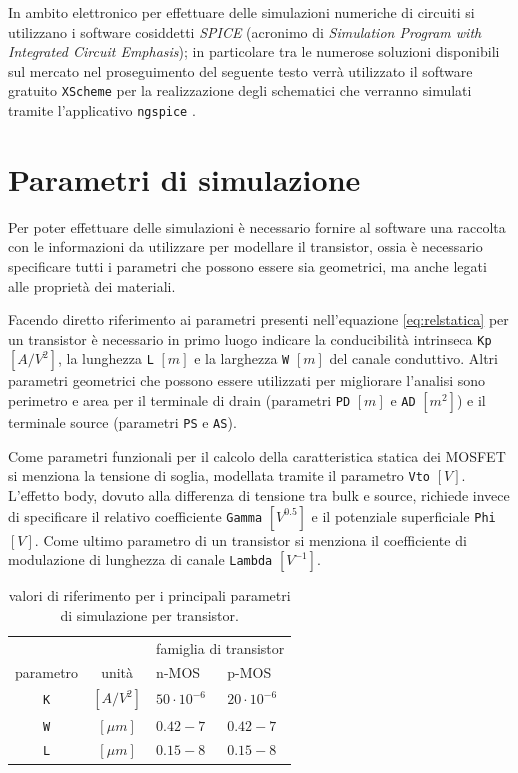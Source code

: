 	\vspace{3mm}
	
	In ambito elettronico per effettuare delle simulazioni numeriche di circuiti si utilizzano i software cosiddetti \textit{SPICE} (acronimo di \textit{Simulation Program with Integrated Circuit Emphasis}); in particolare tra le numerose soluzioni disponibili sul mercato nel proseguimento del seguente testo verrà utilizzato il software gratuito \texttt{XScheme} \cite{xschem} per la realizzazione degli schematici che verranno simulati tramite l'applicativo \texttt{ngspice} \cite{ngspice}.
	
\section{Parametri di simulazione}
	Per poter effettuare delle simulazioni è necessario fornire al software una raccolta con le informazioni da utilizzare per modellare il transistor, ossia è necessario specificare tutti i parametri che possono essere sia geometrici, ma anche legati alle proprietà dei materiali. 
	
	Facendo diretto riferimento ai parametri presenti nell'equazione \ref{eq:relstatica} per un transistor è necessario in primo luogo indicare la conducibilità intrinseca \texttt{Kp} $[A/V^2]$, la lunghezza \texttt{L} $[m]$  e la larghezza \texttt{W} $[m]$  del canale conduttivo. Altri parametri geometrici che possono essere utilizzati per migliorare l'analisi sono perimetro e area per il terminale di drain (parametri \texttt{PD} $[m]$ e \texttt{AD} $[m^2]$) e il terminale source (parametri \texttt{PS} e \texttt{AS}).
	
	Come parametri funzionali per il calcolo della caratteristica statica dei MOSFET si menziona la tensione di soglia, modellata tramite il parametro \texttt{Vto} $[V]$. L'effetto body, dovuto alla differenza di tensione tra bulk e source, richiede invece di specificare il relativo coefficiente \texttt{Gamma} $\left[V^{0.5}\right]$ e il potenziale superficiale \texttt{Phi} $[V]$. Come ultimo parametro di un transistor si menziona il coefficiente di modulazione di lunghezza di canale \texttt{Lambda} $\left[V^{-1}\right]$.
	
	\begin{table}[bht]
		
		\centering
		\begin{tabular}{ c c | p{2cm}  p{2cm}}
			& & \multicolumn{2}{c}{famiglia di transistor }  \\
			parametro & unità & n-MOS & p-MOS \\ \hline 
			\texttt{K} & $[A/V^2]$ & $50\cdot 10^{-6}$ & $20\cdot 10^{-6}$ \\
			\texttt{W} & $[\mu m]$ & $0.42-7$ & $0.42-7$ \\
			\texttt{L} & $[\mu m]$ & $0.15-8$ & $0.15-8$ \\
		\end{tabular}
		\caption{valori di riferimento per i principali parametri di simulazione per transistor.}
		
		
	\end{table}


